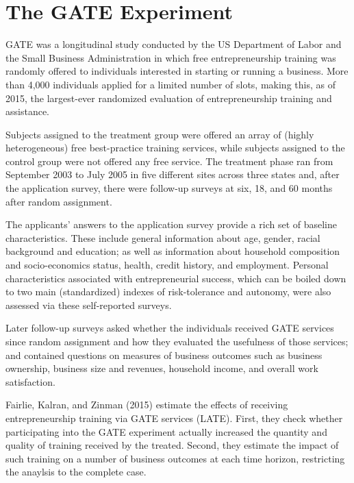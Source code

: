 
\section{The GATE Experiment}
\label{sec:GATE}

\ac{GATE} was a longitudinal study conducted by the US Department of Labor and the Small Business Administration in which free entrepreneurship training was randomly offered to individuals interested in starting or running a business. More than 4,000 individuals applied for a limited number of slots, making this, as of 2015, the largest-ever randomized evaluation of entrepreneurship training and assistance.

Subjects assigned to the treatment group were offered an array of (highly heterogeneous) free best-practice training services, while subjects assigned to the control group were not offered any free service. The treatment phase ran from September 2003 to July 2005 in five different sites across three states and, after the application survey, there were follow-up surveys at six, 18, and 60 months after random assignment.

The applicants' answers to the application survey provide a rich set of baseline characteristics. These include general information about age, gender, racial background and education; as well as information about household composition and socio-economics status, health, credit history, and employment. Personal characteristics associated with entrepreneurial success, which can be boiled down to two main (standardized) indexes of risk-tolerance and autonomy, were also assessed via these self-reported surveys.

Later follow-up surveys asked whether the individuals received GATE services since random assignment and how they evaluated the usefulness of those services; and contained questions on measures of business outcomes such as business ownership, business size and revenues, household income, and overall work satisfaction.

Fairlie, Kalran, and Zinman (2015) estimate the effects of receiving entrepreneurship training via GATE services (LATE). First, they check whether participating into the GATE experiment actually increased the quantity and quality of training received by the treated. Second, they estimate the impact of such training on a number of business outcomes at each time horizon, restricting the anaylsis to the complete case.

